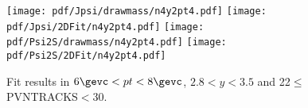 \begin{figure}[H]
\begin{center}
\texttt{[image: pdf/Jpsi/drawmass/n4y2pt4.pdf]}
\texttt{[image: pdf/Jpsi/2DFit/n4y2pt4.pdf]}
\vspace*{-0.5cm}
\texttt{[image: pdf/Psi2S/drawmass/n4y2pt4.pdf]}
\texttt{[image: pdf/Psi2S/2DFit/n4y2pt4.pdf]}
\vspace*{-0.5cm}
\end{center}
\caption{Fit results in $6\gevc<pt<8\gevc$, $2.8<y<3.5$ and 22$\leq$PVNTRACKS$<$30.}
\label{Fitn4y2pt4}
\end{figure}
